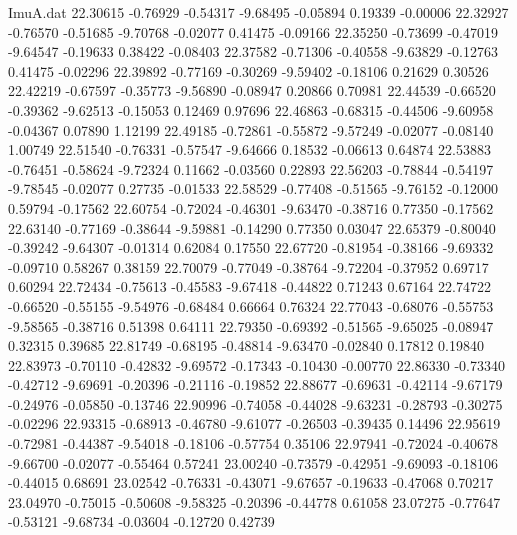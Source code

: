 \begin{filecontents}{ImuA.dat}
  22.30615   -0.76929   -0.54317   -9.68495   -0.05894    0.19339   -0.00006
  22.32927   -0.76570   -0.51685   -9.70768   -0.02077    0.41475   -0.09166
  22.35250   -0.73699   -0.47019   -9.64547   -0.19633    0.38422   -0.08403
  22.37582   -0.71306   -0.40558   -9.63829   -0.12763    0.41475   -0.02296
  22.39892   -0.77169   -0.30269   -9.59402   -0.18106    0.21629    0.30526
  22.42219   -0.67597   -0.35773   -9.56890   -0.08947    0.20866    0.70981
  22.44539   -0.66520   -0.39362   -9.62513   -0.15053    0.12469    0.97696
  22.46863   -0.68315   -0.44506   -9.60958   -0.04367    0.07890    1.12199
  22.49185   -0.72861   -0.55872   -9.57249   -0.02077   -0.08140    1.00749
  22.51540   -0.76331   -0.57547   -9.64666    0.18532   -0.06613    0.64874
  22.53883   -0.76451   -0.58624   -9.72324    0.11662   -0.03560    0.22893
  22.56203   -0.78844   -0.54197   -9.78545   -0.02077    0.27735   -0.01533
  22.58529   -0.77408   -0.51565   -9.76152   -0.12000    0.59794   -0.17562
  22.60754   -0.72024   -0.46301   -9.63470   -0.38716    0.77350   -0.17562
  22.63140   -0.77169   -0.38644   -9.59881   -0.14290    0.77350    0.03047
  22.65379   -0.80040   -0.39242   -9.64307   -0.01314    0.62084    0.17550
  22.67720   -0.81954   -0.38166   -9.69332   -0.09710    0.58267    0.38159
  22.70079   -0.77049   -0.38764   -9.72204   -0.37952    0.69717    0.60294
  22.72434   -0.75613   -0.45583   -9.67418   -0.44822    0.71243    0.67164
  22.74722   -0.66520   -0.55155   -9.54976   -0.68484    0.66664    0.76324
  22.77043   -0.68076   -0.55753   -9.58565   -0.38716    0.51398    0.64111
  22.79350   -0.69392   -0.51565   -9.65025   -0.08947    0.32315    0.39685
  22.81749   -0.68195   -0.48814   -9.63470   -0.02840    0.17812    0.19840
  22.83973   -0.70110   -0.42832   -9.69572   -0.17343   -0.10430   -0.00770
  22.86330   -0.73340   -0.42712   -9.69691   -0.20396   -0.21116   -0.19852
  22.88677   -0.69631   -0.42114   -9.67179   -0.24976   -0.05850   -0.13746
  22.90996   -0.74058   -0.44028   -9.63231   -0.28793   -0.30275   -0.02296
  22.93315   -0.68913   -0.46780   -9.61077   -0.26503   -0.39435    0.14496
  22.95619   -0.72981   -0.44387   -9.54018   -0.18106   -0.57754    0.35106
  22.97941   -0.72024   -0.40678   -9.66700   -0.02077   -0.55464    0.57241
  23.00240   -0.73579   -0.42951   -9.69093   -0.18106   -0.44015    0.68691
  23.02542   -0.76331   -0.43071   -9.67657   -0.19633   -0.47068    0.70217
  23.04970   -0.75015   -0.50608   -9.58325   -0.20396   -0.44778    0.61058
  23.07275   -0.77647   -0.53121   -9.68734   -0.03604   -0.12720    0.42739

\end{filecontents}
